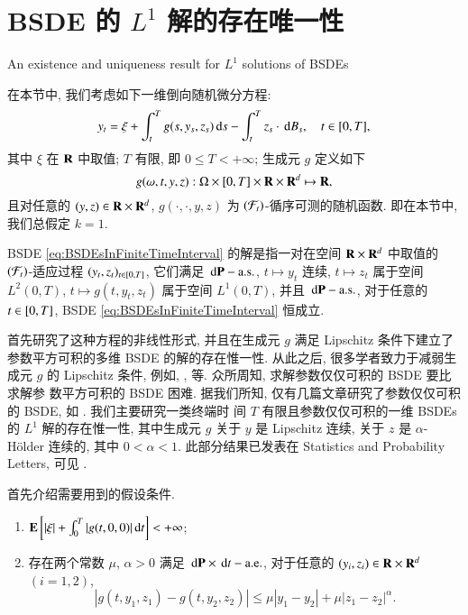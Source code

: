 
\chapter{BSDE 的 $L^1$ 解的存在唯一性}{An existence and
uniqueness result for $L^1$ solutions of BSDEs}
\label{cha:FiniteTimeInterval}

在本节中, 我们考虑如下一维倒向随机微分方程:
\begin{equation}\label{eq:BSDEsInFiniteTimeInterval}
  y_t=\xi+\int^{T}_{t} g(s,y_s,z_s)\,\mathrm{d} s-\int^{T}_{t} z_s\cdot\,\mathrm{d} B_s,\quad t\in[0,T],
\end{equation}
其中 $\xi$ 在 $\mathrm{\mathbf{R}}$ 中取值; $T$ 有限, 即 $0\leq T<+\infty$; 生成元 $g$ 定义如下
$$g(\omega,t,y,z):\Omega\times[0,T]\times\mathrm{\mathbf{R}}\times\mathrm{\mathbf{R}}^d\mapsto \mathrm{\mathbf{R}},$$
且对任意的 $(y,z)\in\mathrm{\mathbf{R}}\times\mathrm{\mathbf{R}}^d$, $g(\cdot,\cdot,y,z)$ 为
$(\mathcal{F}_t)$-循序可测的随机函数. 即在本节中, 我们总假定 $k=1$.

\begin{definition}\label{def:DefinitionOfBSDEInFiniteTimeInterval}
  BSDE \eqref{eq:BSDEsInFiniteTimeInterval} 的解是指一对在空间 $\mathrm{\mathbf{R}}\times\mathrm{\mathbf{R}}^d$
  中取值的 $(\mathcal{F}_t)$-适应过程 $(y_t,z_t)_{t\in[0,T]}$, 它们满足 $\,\mathrm{d}\mathrm{\mathbf{P}}-\mathrm{a.s.}$, $t\mapsto y_t$
  连续, $t\mapsto z_t$ 属于空间 $L^2(0,T)$, $t\mapsto g(t,y_t,z_t)$ 属于空间 $L^1(0,T)$,
  并且 $\,\mathrm{d}\mathrm{\mathbf{P}}-\mathrm{a.s.}$, 对于任意的 $t\in[0,T]$, BSDE \eqref{eq:BSDEsInFiniteTimeInterval} 恒成立.
\end{definition}

\citet*{PardouxPeng1990SCL} 首先研究了这种方程的非线性形式, 并且在生成元 $g$ 满足
 Lipschitz 条件下建立了参数平方可积的多维 BSDE 的解的存在惟一性. 从此之后,
很多学者致力于减弱生成元 $g$ 的 Lipschitz 条件, 例如, \citet*{Mao1995SPA},
\cite*{LepeltierSanMartin1997SPL} 等. 众所周知, 求解参数仅仅可积的 BSDE 要比求解参
数平方可积的 BSDE 困难. 据我们所知, 仅有几篇文章研究了参数仅仅可积的 BSDE, 如
\citet*{BriandDelyonHu2003SPA}. 我们主要研究一类终端时
间 $T$ 有限且参数仅仅可积的一维 BSDEs 的 $L^1$ 解的存在惟一性, 其中生成元 $g$
关于 $y$ 是 Lipschitz 连续, 关于 $z$ 是 $\alpha$-H\"{o}lder 连续的, 其中
 $0<\alpha<1$. 此部分结果已发表在 Statistics and Probability Letters, 可见
 \citet*{FanLiu2010SPL}.

首先介绍需要用到的假设条件.

\begin{enumerate}
\renewcommand{\theenumi}{(B\arabic{enumi})}
\renewcommand{\labelenumi}{\theenumi}

  \item\label{HInFiniteTimeInterval:OnlyIntegrable}
          $\mathrm{\mathbf{E}}
          \left[|\xi|+
              \int^{T}_{0}|g(t,0,0)|\,\mathrm{d} t
          \right]<+\infty$;
  \item\label{HInFiniteTimeInterval:LipschitzAndAlphaHolder}
       存在两个常数 $\mu$, $\alpha>0$ 满足 $\,\mathrm{d}\mathrm{\mathbf{P}}\times\,\mathrm{d} t-\mathrm{a.e.}$, 对于任意的 $(y_i,z_i)\in\mathrm{\mathbf{R}}\times\mathrm{\mathbf{R}}^d$ $(i=1,2)$,
       \begin{equation*}
         |g(t,y_1,z_1)-g(t,y_2,z_2)|\leq \mu|y_1-y_2|+\mu|z_1-z_2|^\alpha.
       \end{equation*}
\end{enumerate}

